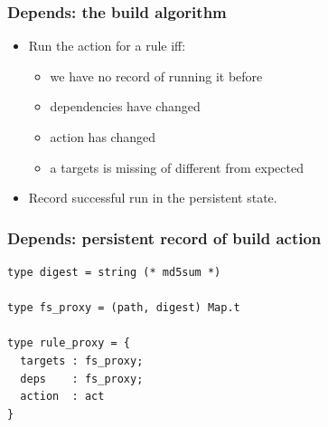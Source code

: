 \documentclass{beamer}
\begin{document}

\begin{frame}[fragile]
\frametitle{Depends: the build algorithm}
\begin{itemize}
\item Run the action for a rule iff:
\begin{itemize}
\item we have no record of running it before
\item dependencies have changed
\item action has changed
\item a targets is missing of different from expected
\end{itemize}
\item Record successful run in the persistent state.
\end{itemize}
\end{frame}




\begin{frame}[fragile]
\frametitle{Depends: persistent record of build action}
{\footnotesize
\begin{verbatim}
type digest = string (* md5sum *)

type fs_proxy = (path, digest) Map.t

type rule_proxy = {
  targets : fs_proxy;
  deps    : fs_proxy;
  action  : act
}

\end{verbatim}}
\end{frame}


% 

\end{document}
